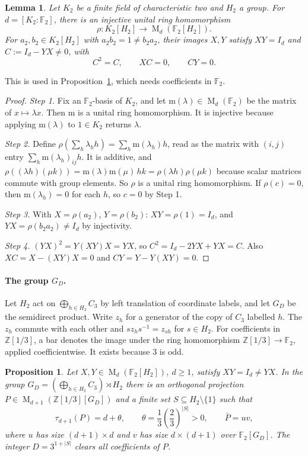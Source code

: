\documentclass[11pt]{article}
\newtheorem{proposition}[theorem]{Proposition}
\newtheorem{lemma}[theorem]{Lemma}
\theoremstyle{remark}
\numberwithin{equation}{section}
\newcommand{\F}{\mathbb F}
\newcommand{\Z}{\mathbb Z}
\newcommand{\Mat}{\operatorname{M}}
\begin{document}
\begin{lemma}\label{lem:binary}
Let $K_2$ be a finite field of characteristic two and $H_2$ a group.
For $d=[K_2:\F_2]$, there is an injective unital ring homomorphism
\[
 \rho:K_2[H_2]\longrightarrow\Mat_d(\F_2[H_2]).
\]
For $a_2,b_2\in K_2[H_2]$ with $a_2b_2=1\ne b_2a_2$, their images $X,Y$ satisfy
$XY=I_d$ and $C:=I_d-YX\ne0$, with
\begin{equation}\label{eq:defect}
 C^2=C,\qquad XC=0,\qquad CY=0.
\end{equation}
\end{lemma}

This is used in Proposition~\ref{prop:separation}, which needs coefficients in $\F_2$.

\begin{proof}
\emph{Step 1.} Fix an $\F_2$-basis of $K_2$, and let $\mathrm m(\lambda)\in\Mat_d(\F_2)$ be the matrix of $x\mapsto\lambda x$. Then $\mathrm m$ is a unital ring homomorphism. It is injective because applying $\mathrm m(\lambda)$ to $1\in K_2$ returns $\lambda$.

\emph{Step 2.} Define $\rho(\sum_h\lambda_hh)=\sum_h\mathrm m(\lambda_h)h$, read as the matrix with $(i,j)$ entry $\sum_h\mathrm m(\lambda_h)_{ij}h$. It is additive, and $\rho((\lambda h)(\mu k))=\mathrm m(\lambda)\mathrm m(\mu)\,hk=\rho(\lambda h)\rho(\mu k)$ because scalar matrices commute with group elements. So $\rho$ is a unital ring homomorphism. If $\rho(c)=0$, then $\mathrm m(\lambda_h)=0$ for each $h$, so $c=0$ by Step 1.

\emph{Step 3.} With $X=\rho(a_2)$, $Y=\rho(b_2)$: $XY=\rho(1)=I_d$, and $YX=\rho(b_2a_2)\ne I_d$ by injectivity.

\emph{Step 4.} $(YX)^2=Y(XY)X=YX$, so $C^2=I_d-2YX+YX=C$. Also $XC=X-(XY)X=0$ and $CY=Y-Y(XY)=0$.
\end{proof}

\paragraph{The group $G_D$.} Let $H_2$ act on $\bigoplus_{h\in H_2}C_3$ by left translation of coordinate labels, and let $G_D$ be the semidirect product. Write $z_h$ for a generator of the copy of $C_3$ labelled $h$. The $z_h$ commute with each other and $s z_hs^{-1}=z_{sh}$ for $s\in H_2$. For coefficients in $\Z[1/3]$, a bar denotes the image under the ring homomorphism $\Z[1/3]\to\F_2$, applied coefficientwise. It exists because $3$ is odd.

\begin{proposition}\label{prop:separation}
Let $X,Y\in\Mat_d(\F_2[H_2])$, $d\ge1$, satisfy
$XY=I_d\ne YX$. In the group
$G_D=(\bigoplus_{h\in H_2}C_3)\rtimes H_2$ there is an orthogonal
projection $P\in\Mat_{d+1}(\Z[1/3][G_D])$ and a finite set
$S\subseteq H_2\setminus\{1\}$ such that
\[
 \tau_{d+1}(P)=d+\theta,\qquad
 \theta=\frac13\left(\frac23\right)^{|S|}>0,
 \qquad \bar P=uv,
\]
where $u$ has size $(d+1)\times d$ and $v$ has size $d\times(d+1)$
over $\F_2[G_D]$. The integer $D=3^{1+|S|}$ clears all coefficients
of $P$.
\end{proposition}
\end{document}
